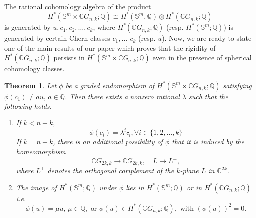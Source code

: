 \documentclass{amsart}
\newtheorem{theorem}{Theorem}[section]
\begin{document}
	The rational cohomology algebra of the %
product
	\[
	H^*(\mathbb S^m \times \mathbb CG_{n,k};\mathbb Q)\cong H^*(\mathbb S^m,\mathbb Q)\otimes H^*(\mathbb CG_{n,k};\mathbb Q)
	\]
	is %
generated by $u,c_1,c_2,\dots,c_k$, where $H^*(\mathbb{C}G_{n,k};\mathbb{Q})$ (resp. $H^*(\mathbb S^m;\mathbb Q)$) is generated by certain Chern classes $c_1, \dots, c_k$ (resp. $u$). Now, we are ready to state one of the main results of our paper which proves that the rigidity of $H^*(\mathbb CG_{n,k};\mathbb Q)$ persists in $H^*(\mathbb S^m \times \mathbb CG_{n,k};\mathbb Q)$ even in the presence %
of spherical cohomology %
classes.
	\begin{theorem}
		Let $\phi$ be a graded endomorphism of 
		$H^*(\mathbb S^{m}\times\mathbb C G_{n,k};\mathbb Q)$ 
		satisfying $\phi(c_1)\neq a u, \, a\in\mathbb Q$.  
		Then there exists a nonzero rational $\lambda$ such that the following holds.
		\begin{enumerate}\label{result main}
			\item If %
$k < n - k,$ 
			$$ \phi(c_i) = \lambda^i c_i, \forall i \in \{1,2,\dots,k\}$$
			If %
$k = n - k$, there is an additional possibility of $\phi$ that it is induced by the %
homeomorphism 
			\[
			\mathbb{C}G_{2k,k} \longrightarrow \mathbb{C}G_{2k,k}, 
			\quad L \longmapsto L^{\perp},
			\]
			where %
$L^{\perp}$ denotes the orthogonal complement of the $k$-plane $L$ in $\mathbb{C}^{2k}$.
			
			\item 
			The image of $H^*(\mathbb{S}^m;\mathbb{Q})$ under $\phi$ lies in 
			$H^*(\mathbb{S}^m;\mathbb{Q})$ or in $H^*(\mathbb{C}G_{n,k};\mathbb{Q})$ %
i.e. $$\phi(u) = \mu u,\, \mu \in \mathbb{Q}, \text{ or } \phi(u) \in H^*(\mathbb{C}G_{n,k};\mathbb{Q}), \text{ with } (\phi(u))^2 =0.$$
			
		\end{enumerate}
	\end{theorem}
\end{document}
